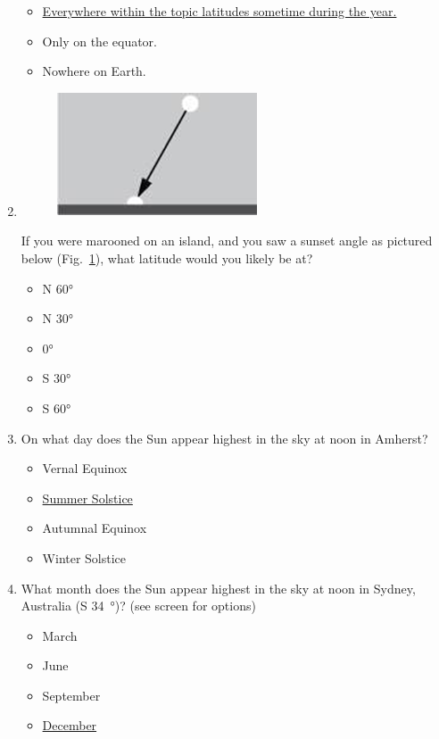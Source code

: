 \documentclass[12pt]{article}
\begin{document}
\begin{enumerate}
\begin{itemize}
    \item \underline{Everywhere within the topic latitudes sometime during the year.}
    \item Only on the equator.
    \item Nowhere on Earth.
\end{itemize}
\item
\begin{figure}[htbp]
    \centering
    \includegraphics{lab2_q4.png}
    \caption{}
    \label{fig:l5q4}
\end{figure}
If you were marooned on an island, and you saw a sunset angle as pictured below (Fig.~\ref{fig:l5q4}), what latitude would you likely be at?
\begin{itemize}
    \item N 60°
    \item N 30°
    \item 0°
    \item S 30°
    \item S 60°
\end{itemize}
\item
On what day does the Sun appear highest in the sky at noon in Amherst?
\begin{itemize}
    \item Vernal Equinox
    \item \underline{Summer Solstice}
    \item Autumnal Equinox
    \item Winter Solstice
\end{itemize}
\item
What month does the Sun appear highest in the sky at noon in Sydney, Australia (S \SI{34}{\degree})? (see screen for options)
\begin{itemize}
    \item March
    \item June
    \item September
    \item \underline{December} 
\end{itemize}
\end{enumerate}
\end{document}

